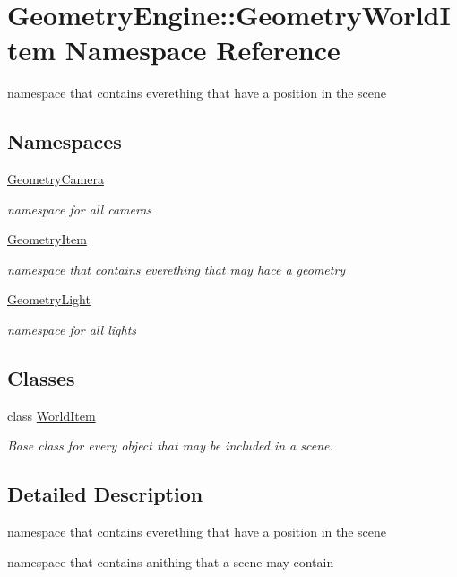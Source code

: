 \hypertarget{namespace_geometry_engine_1_1_geometry_world_item}{}\section{Geometry\+Engine\+::Geometry\+World\+Item Namespace Reference}
\label{namespace_geometry_engine_1_1_geometry_world_item}


namespace that contains everething that have a position in the scene  


\subsection*{Namespaces}
\begin{DoxyCompactItemize}
\item 
 \mbox{\hyperlink{namespace_geometry_engine_1_1_geometry_world_item_1_1_geometry_camera}{Geometry\+Camera}}
\begin{DoxyCompactList}\small\item\em namespace for all cameras \end{DoxyCompactList}\item 
 \mbox{\hyperlink{namespace_geometry_engine_1_1_geometry_world_item_1_1_geometry_item}{Geometry\+Item}}
\begin{DoxyCompactList}\small\item\em namespace that contains everething that may hace a geometry \end{DoxyCompactList}\item 
 \mbox{\hyperlink{namespace_geometry_engine_1_1_geometry_world_item_1_1_geometry_light}{Geometry\+Light}}
\begin{DoxyCompactList}\small\item\em namespace for all lights \end{DoxyCompactList}\end{DoxyCompactItemize}
\subsection*{Classes}
\begin{DoxyCompactItemize}
\item 
class \mbox{\hyperlink{class_geometry_engine_1_1_geometry_world_item_1_1_world_item}{World\+Item}}
\begin{DoxyCompactList}\small\item\em Base class for every object that may be included in a scene. \end{DoxyCompactList}\end{DoxyCompactItemize}


\subsection{Detailed Description}
namespace that contains everething that have a position in the scene 

namespace that contains anithing that a scene may contain 